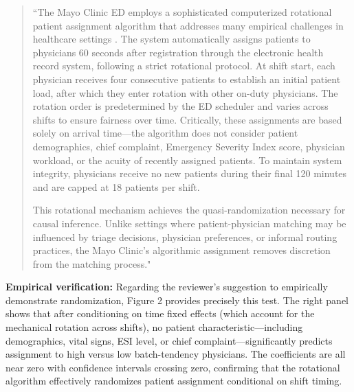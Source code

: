 \documentclass[11pt]{article}
\newcommand{\1}{\hbox{\rm 1\kern-.35em 1}}
\begin{document}
\begin{quote}
``The Mayo Clinic ED employs a sophisticated computerized rotational patient assignment algorithm that addresses many empirical challenges in healthcare settings \cite{Traub2016, traub2016emergency, Traub2018}. The system automatically assigns patients to physicians 60 seconds after registration through the electronic health record system, following a strict rotational protocol. At shift start, each physician receives four consecutive patients to establish an initial patient load, after which they enter rotation with other on-duty physicians. The rotation order is predetermined by the ED scheduler and varies across shifts to ensure fairness over time. Critically, these assignments are based solely on arrival time—the algorithm does not consider patient demographics, chief complaint, Emergency Severity Index score, physician workload, or the acuity of recently assigned patients. To maintain system integrity, physicians receive no new patients during their final 120 minutes and are capped at 18 patients per shift.

This rotational mechanism achieves the quasi-randomization necessary for causal inference. Unlike settings where patient-physician matching may be influenced by triage decisions, physician preferences, or informal routing practices, the Mayo Clinic's algorithmic assignment removes discretion from the matching process."
\end{quote}

\textbf{Empirical verification:} Regarding the reviewer's suggestion to empirically demonstrate randomization, Figure 2 provides precisely this test. The right panel shows that after conditioning on time fixed effects (which account for the mechanical rotation across shifts), no patient characteristic—including demographics, vital signs, ESI level, or chief complaint—significantly predicts assignment to high versus low batch-tendency physicians. The coefficients are all near zero with confidence intervals crossing zero, confirming that the rotational algorithm effectively randomizes patient assignment conditional on shift timing.
\end{document}
